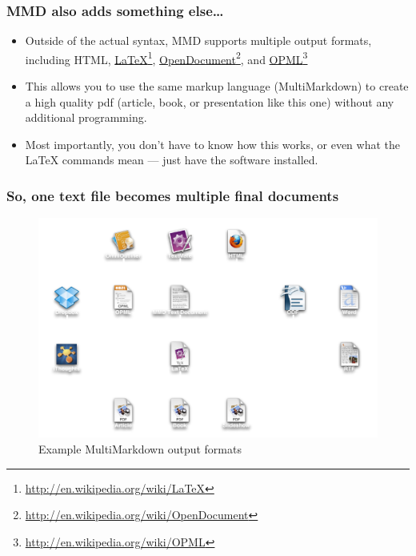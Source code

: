 \begin{frame}[fragile]
\frametitle{MMD also adds something else{\ldots} }
\label{mmdalsoaddssomethingelse...}

\begin{itemize}
\item{} Outside of the actual syntax, MMD supports multiple output formats,
including HTML, \href{http://en.wikipedia.org/wiki/LaTeX}{LaTeX}\footnote{\href{http://en.wikipedia.org/wiki/LaTeX}{http:\slash \slash en.wikipedia.org\slash wiki\slash LaTeX}},
\href{http://en.wikipedia.org/wiki/OpenDocument}{OpenDocument}\footnote{\href{http://en.wikipedia.org/wiki/OpenDocument}{http:\slash \slash en.wikipedia.org\slash wiki\slash OpenDocument}}, and
\href{http://en.wikipedia.org/wiki/OPML}{OPML}\footnote{\href{http://en.wikipedia.org/wiki/OPML}{http:\slash \slash en.wikipedia.org\slash wiki\slash OPML}}

\item{} This allows you to use the same markup language (MultiMarkdown) to create a
high quality pdf (article, book, or presentation like this one) without any
additional programming.

\item{} Most importantly, you don't have to know how this works, or even what
the LaTeX commands mean --- just have the software installed.

\end{itemize}

\end{frame}

\begin{frame}[fragile]
\frametitle{So, one text file becomes multiple final documents }
\label{soonetextfilebecomesmultiplefinaldocuments}

\begin{figure}[htbp]
\centering
\includegraphics[keepaspectratio,width=\textwidth,height=0.75\textheight]{OPML-MMD-Map.pdf}
\caption{Example MultiMarkdown output formats}
\end{figure}

\end{frame}

